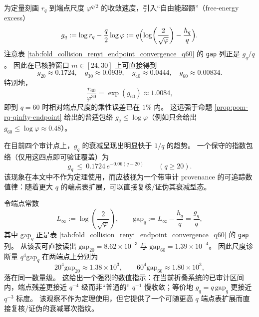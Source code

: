 \begin{remark}\label{rem:pom-free-energy-excess-gq}
为定量刻画 \(r_q\) 到端点尺度 \(\varphi^{q/2}\) 的收敛速度，引入“自由能超额”（free-energy excess）
\[
g_q:=\log r_q-\frac{q}{2}\log\varphi
:= q\Bigl(\log\!\left(\frac{2}{\sqrt{\varphi}}\right)-\frac{h_q}{q}\Bigr).
\]
注意表 \ref{tab:fold_collision_renyi_endpoint_convergence_q60} 的 \texttt{gap} 列正是 \(g_q/q\)。
因此在已核验窗口 \(m\in[24,30]\) 上可直接得到
\[
g_{20}\approx 0.1724,\quad g_{30}\approx 0.0939,\quad g_{40}\approx 0.0444,\quad g_{60}\approx 0.00834.
\]
特别地，
\[
\frac{r_{60}}{\varphi^{30}}=\exp(g_{60})\approx 1.0084,
\]
即到 \(q=60\) 时相对端点尺度的乘性误差已在 \(1\%\) 内。
这远强于命题 \ref{prop:pom-rq-qinfty-endpoint} 给出的普适包络 \(g_q\le \log\varphi\)（例如只会给出 \(g_{60}\le\log\varphi\approx 0.48\)）。
\par
在目前四个审计点上，\(g_q\) 的衰减呈现出明显快于 \(1/q\) 的趋势。
一个保守的指数包络（仅用这四点即可验证覆盖）为
\[
g_q\ \le\ 0.1724\,e^{-0.06(q-20)}\qquad(q\ge 20).
\]
该现象在本文中不作为定理使用，而应被视为一个带审计 provenance 的可追踪数值律：随着更大 \(q\) 的端点表扩展，可以直接复核/证伪其衰减型态。
\end{remark}



\begin{remark}\label{rem:pom-endpoint-gap-qminus4}
令端点常数
\[
L_\infty:=\log\!\left(\frac{2}{\sqrt{\varphi}}\right),
\qquad
\mathrm{gap}_q:=L_\infty-\frac{h_q}{q}=\frac{g_q}{q},
\]
其中 \(\mathrm{gap}_q\) 正是表 \ref{tab:fold_collision_renyi_endpoint_convergence_q60} 的 \texttt{gap} 列。
从该表可直接读出
\(
\mathrm{gap}_{20}=8.62\times 10^{-3}
\)
与
\(
\mathrm{gap}_{60}=1.39\times 10^{-4}
\)。
因此尺度诊断量
\(
q^4\mathrm{gap}_q
\)
在两端点上分别为
\[
20^4\mathrm{gap}_{20}\approx 1.38\times 10^3,
\qquad
60^4\mathrm{gap}_{60}\approx 1.80\times 10^3,
\]
落在同一数量级。
这给出一个强烈的数值指示：在当前折叠系统的已审计区间内，端点残差更接近 \(q^{-4}\) 级而非“普通的” \(q^{-1}\) 慢收敛；等价地 \(g_q=q\,\mathrm{gap}_q\) 更接近 \(q^{-3}\) 标度。
该观察不作为定理使用，但它提供了一个可随更高 \(q\) 端点表扩展而直接复核/证伪的衰减幂次指纹。
\end{remark}

